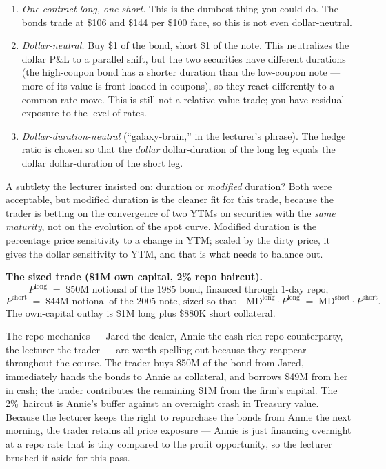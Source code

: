 \begin{enumerate}
  \item \emph{One contract long, one short.} This is the dumbest thing you
        could do. The bonds trade at \$106 and \$144 per \$100 face, so this
        is not even dollar-neutral.
  \item \emph{Dollar-neutral.} Buy \$1 of the bond, short \$1 of the note.
        This neutralizes the dollar P\&L to a parallel shift, but the two
        securities have different durations (the high-coupon bond has a
        shorter duration than the low-coupon note --- more of its value is
        front-loaded in coupons), so they react differently to a common
        rate move. This is still not a relative-value trade; you have
        residual exposure to the level of rates.
  \item \emph{Dollar-duration-neutral} (``galaxy-brain,'' in the lecturer's
        phrase). The hedge ratio is chosen so that the \emph{dollar}
        dollar-duration of the long leg equals the dollar dollar-duration of
        the short leg.
\end{enumerate}

A subtlety the lecturer insisted on: duration or \emph{modified} duration?
Both were acceptable, but modified duration is the cleaner fit for this
trade, because the trader is betting on the convergence of two YTMs on
securities with the \emph{same maturity}, not on the evolution of the spot
curve. Modified duration is the percentage price sensitivity to a change in
YTM; scaled by the dirty price, it gives the dollar sensitivity to YTM, and
that is what needs to balance out.

\begin{keyblock}
\textbf{The sized trade (\$1M own capital, 2\% repo haircut).}
\[
   P^{\text{long}} \;=\; \text{\$50M notional} \;\text{of the 1985 bond, financed through 1-day repo},
\]
\[
  P^{\text{short}} \;=\; \text{\$44M notional} \;\text{of the 2005 note, sized so that}
  \quad \mathrm{MD}^{\text{long}} \cdot P^{\text{long}} \;=\; \mathrm{MD}^{\text{short}} \cdot P^{\text{short}}.
\]
The own-capital outlay is \$1M long plus \$880K short collateral.
\end{keyblock}

The repo mechanics --- Jared the dealer, Annie the cash-rich repo
counterparty, the lecturer the trader --- are worth spelling out because
they reappear throughout the course. The trader buys \$50M of the bond from
Jared, immediately hands the bonds to Annie as collateral, and borrows
\$49M from her in cash; the trader contributes the remaining \$1M from the
firm's capital. The 2\%~haircut is Annie's buffer against an overnight
crash in Treasury value. Because the lecturer keeps the right to repurchase
the bonds from Annie the next morning, the trader retains all price
exposure --- Annie is just financing overnight at a repo rate that is tiny
compared to the profit opportunity, so the lecturer brushed it aside for
this pass.

